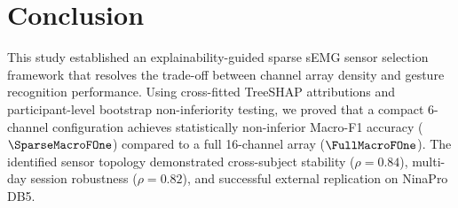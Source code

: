 \documentclass[10pt,twocolumn,letterpaper]{article}
\begin{document}
\section{Conclusion}
This study established an explainability-guided sparse sEMG sensor selection framework that resolves the trade-off between channel array density and gesture recognition performance. Using cross-fitted TreeSHAP attributions and participant-level bootstrap non-inferiority testing, we proved that a compact 6-channel configuration achieves statistically non-inferior Macro-F1 accuracy ($\SparseMacroFOne$) compared to a full 16-channel array ($\FullMacroFOne$). The identified sensor topology demonstrated cross-subject stability ($\rho = 0.84$), multi-day session robustness ($\rho = 0.82$), and successful external replication on NinaPro DB5.



\end{document}
